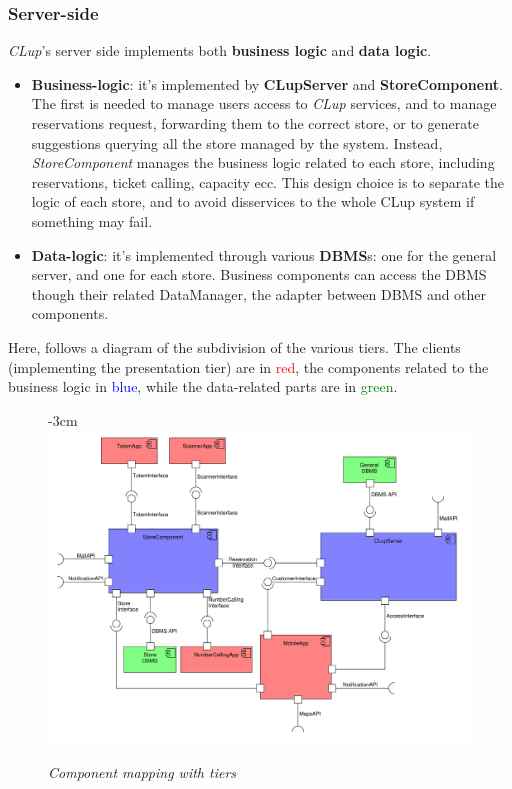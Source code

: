 \documentclass{article}
\begin{document}
	\subsubsection{Server-side}
	\emph{CLup}'s server side implements both {\bfseries business logic} and {\bfseries data logic}.
	\begin{itemize}
		\item {\bfseries Business-logic}: it's implemented by {\bfseries CLupServer} and {\bfseries StoreComponent}. The first is needed to manage users access to \emph{CLup} services, and to manage reservations request, forwarding them to the correct store, or to generate suggestions querying all the store managed by the system. Instead, \emph{StoreComponent} manages the business logic related to each store, including reservations, ticket calling, capacity ecc. This design choice is to separate the logic of each store, and to avoid disservices to the whole CLup system if something may fail.
		\item{\bfseries Data-logic}: it's implemented through various {\bfseries DBMS}s: one for the general server, and one for each store. Business components can access the DBMS though their related DataManager, the adapter between DBMS and other components.
	\end{itemize}
	Here, follows a diagram of the subdivision of the various tiers. The clients (implementing the presentation tier) are in \textcolor{red}{red}, the components related to the business logic in \textcolor{blue}{blue}, while the data-related parts are in \textcolor{green}{green}.
	\bigskip
	\begin{figure}[H]
		\begin{adjustwidth} {-3cm}{}
			\centering
			\includegraphics[scale=0.45]{Component Diagrams/ColorfulHighLevel.pdf}\\
		\end{adjustwidth}
		\caption{\emph{Component mapping with tiers}}
	\end{figure}
\end{document}

